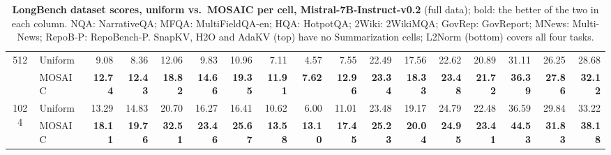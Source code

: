 \begin{table}[tp]
\begin{tabular}{@{} c l rrrr rrrr rrrr rrr @{}}
    \cmidrule(l){1-17}
    \multirow{2}{*}{512} & Uniform & 9.08 & 8.36 & 12.06 & 9.83 & 10.96 & 7.11 & 4.57 & 7.55 & 22.49 & 17.56 & 22.62 & 20.89 & 31.11 & 26.25 & 28.68 \\
     & MOSAIC & \textbf{12.74} & \textbf{12.43} & \textbf{18.82} & \textbf{14.66} & \textbf{19.35} & \textbf{11.91} & \textbf{7.62} & \textbf{12.96} & \textbf{23.34} & \textbf{18.33} & \textbf{23.48} & \textbf{21.72} & \textbf{36.39} & \textbf{27.86} & \textbf{32.12} \\
    \cmidrule(l){1-17}
    \multirow{2}{*}{1024} & Uniform & 13.29 & 14.83 & 20.70 & 16.27 & 16.41 & 10.62 & 6.00 & 11.01 & 23.48 & 19.17 & 24.79 & 22.48 & 36.59 & 29.84 & 33.22 \\
     & MOSAIC & \textbf{18.11} & \textbf{19.76} & \textbf{32.51} & \textbf{23.46} & \textbf{25.67} & \textbf{13.58} & \textbf{13.10} & \textbf{17.45} & \textbf{25.23} & \textbf{20.04} & \textbf{24.95} & \textbf{23.41} & \textbf{44.53} & \textbf{31.83} & \textbf{38.18} \\
    \bottomrule
  \end{tabular}
  \caption{\textbf{LongBench dataset scores, uniform vs.\ MOSAIC per cell, Mistral-7B-Instruct-v0.2} (full data); bold: the better of the two in each column. NQA: NarrativeQA; MFQA: MultiFieldQA-en; HQA: HotpotQA; 2Wiki: 2WikiMQA; GovRep: GovReport; MNews: Multi-News; RepoB-P: RepoBench-P. SnapKV, H2O and AdaKV (top) have no Summarization cells; L2Norm (bottom) covers all four tasks.}
  \label{tab:app-lb-mistral}
\end{table}
